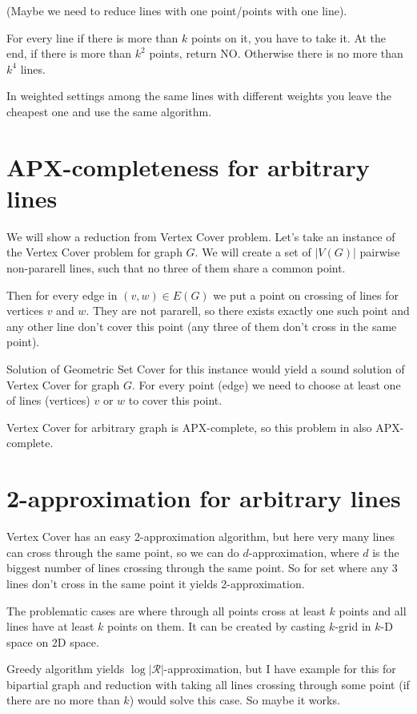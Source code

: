 \documentclass[en]{pracamgr}
\begin{document}
(Maybe we need to reduce lines with one point/points with one line).

For every line if there is more than $k$ points on it,
you have to take it. At the end, if there is more than $k^2$ points,
return NO.
Otherwise there is no more than $k^4$ lines.

In weighted settings among the same lines with different weights
you leave the cheapest one and use the same algorithm.

\section{APX-completeness for arbitrary lines}
We will show a reduction from Vertex Cover problem.
Let's take an instance of the Vertex Cover problem for graph $G$.
We will create a set of $|V(G)|$ pairwise non-pararell lines,
such that no three of them share a common point.

Then for every edge in $(v, w) \in E(G)$
we put a point on crossing of lines for vertices $v$ and $w$.
They are not pararell, so there exists exactly one such point
and any other line don't cover this point (any three of them don't
cross in the same point).

Solution of Geometric Set Cover for this instance would yield
a sound solution of Vertex Cover for graph $G$.
For every point (edge) we need to choose at least one of
lines (vertices) $v$ or $w$ to cover this point.

Vertex Cover for arbitrary graph is APX-complete,
so this problem in also APX-complete.

\section{2-approximation for arbitrary lines}
Vertex Cover has an easy 2-approximation algorithm,
but here very many lines can cross through
the same point, so we can do $d$-approximation,
where $d$ is the biggest number of lines crossing through the same point.
So for set where any 3 lines don't cross in the same point
it yields 2-approximation.

The problematic cases are where through all points
cross at least $k$ points and all lines have at least $k$ points on them.
It can be created by casting $k$-grid in $k$-D space on 2D space.

Greedy algorithm yields $\log |\mathcal{R}|$-approximation,
but I have example for this for bipartial graph and
reduction with taking all lines crossing through some point
(if there are no more than $k$) would solve this case.
So maybe it works.
\end{document}
